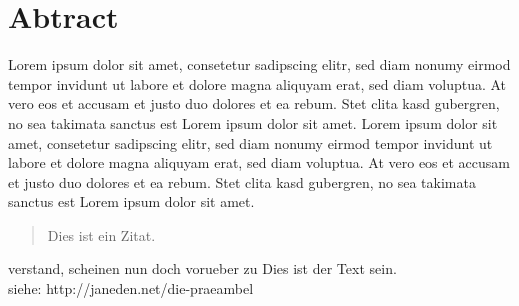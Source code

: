 \pagestyle{empty} %


\chapter*{Abtract} %
\label{cha:abtract}
	Lorem ipsum dolor sit amet, consetetur sadipscing elitr, sed diam nonumy eirmod tempor invidunt ut labore et dolore magna aliquyam erat, sed diam voluptua. At vero eos et accusam et justo duo dolores et ea rebum. Stet clita kasd gubergren, no sea takimata sanctus est Lorem ipsum dolor sit amet. Lorem ipsum dolor sit amet, consetetur sadipscing elitr, sed diam nonumy eirmod tempor invidunt ut labore et dolore magna aliquyam erat, sed diam voluptua. At vero eos et accusam et justo duo dolores et ea rebum. Stet clita kasd gubergren, no sea takimata sanctus est Lorem ipsum dolor sit amet.
	
\begin{quote}
Dies ist ein Zitat.
\end{quote}

verstand, scheinen nun doch vorueber zu Dies ist der Text sein. \\
siehe: http://janeden.net/die-praeambel

